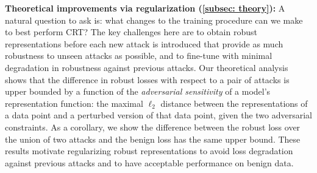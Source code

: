 


\noindent \textbf{Theoretical improvements via regularization (\cref{subsec: theory}):} A natural question to ask is: what changes to the training procedure can we make to best perform CRT?  The key challenges here are to obtain robust representations before each new attack is introduced that provide as much robustness to unseen attacks as possible, and to fine-tune with minimal degradation in robustness against previous attacks. Our theoretical analysis shows that the difference in robust losses with respect to a pair of attacks is upper bounded by a function of the \textit{adversarial sensitivity} of a model's representation function: the maximal $\ell_2$ distance between the representations of a data point and a perturbed version of that data point, given the two adversarial constraints.
As a corollary, we show the difference between the robust loss over the union of two attacks and the benign loss has the same upper bound. These results motivate regularizing robust representations to avoid loss degradation against previous attacks and to have acceptable performance on benign data.

